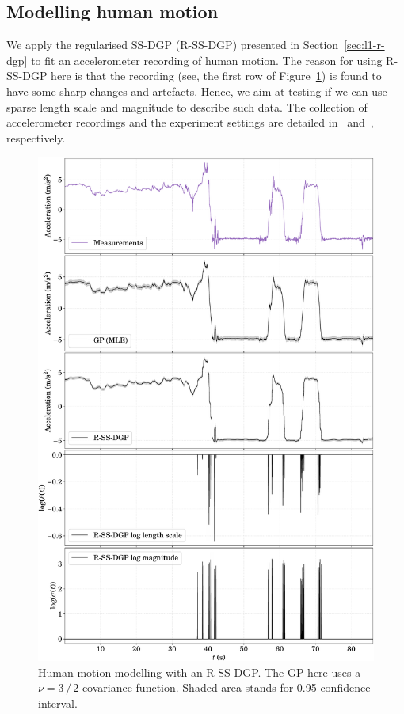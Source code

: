 \subsection*{Modelling human motion}
We apply the regularised SS-DGP (R-SS-DGP) presented in Section~\ref{sec:l1-r-dgp} to fit an accelerometer recording of human motion. The reason for using R-SS-DGP here is that the recording (see, the first row of Figure~\ref{fig:imu-r-ssdgp}) is found to have some sharp changes and artefacts. Hence, we aim at testing if we can use sparse length scale and magnitude to describe such data. The collection of accelerometer recordings and the experiment settings are detailed in~\citet{Hostettler2018} and~\citet{Zhao2021RSSGP}, respectively.

\begin{figure}[t!]
	\centering
	\includegraphics[width=.99\linewidth]{figs/imu-r-ssdgp}
	\caption{Human motion modelling with an R-SS-DGP. The GP here uses a \matern $\nu=3\,/\,2$ covariance function. Shaded area stands for 0.95 confidence interval.}
	\label{fig:imu-r-ssdgp}
\end{figure}

